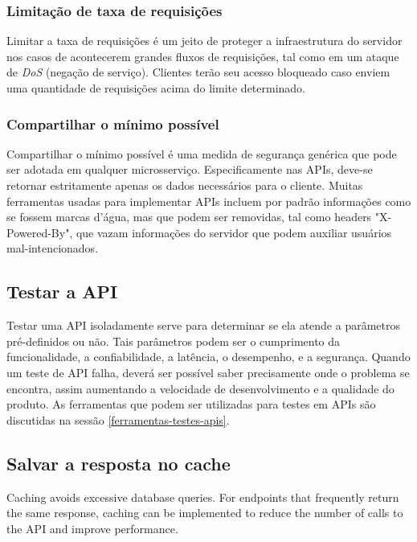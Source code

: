 \subsubsection*{Limitação de taxa de requisições}
Limitar a taxa de requisições é um jeito de proteger a infraestrutura do servidor nos casos de acontecerem grandes fluxos de requisições, tal como em um ataque de \emph{DoS} (negação de serviço). Clientes terão seu acesso bloqueado caso enviem uma quantidade de requisições acima do limite determinado. \cite{rapidAPI-twitter}

\subsubsection*{Compartilhar o mínimo possível}
Compartilhar o mínimo possível é uma medida de segurança genérica que pode ser adotada em qualquer microsserviço. Especificamente nas APIs, deve-se retornar estritamente apenas os dados necessários para o cliente. Muitas ferramentas usadas para implementar APIs incluem por padrão informações como se fossem marcas d'água, mas que podem ser removidas, tal como headers "X-Powered-By", que vazam informações do servidor que podem auxiliar usuários mal-intencionados. \cite{rapidAPI-twitter}

\subsection{Testar a API}
Testar uma API isoladamente serve para determinar se ela atende a parâmetros pré-definidos ou não. Tais parâmetros podem ser o cumprimento da funcionalidade, a confiabilidade, a latência, o desempenho, e a segurança. Quando um teste de API falha, deverá ser possível saber precisamente onde o problema se encontra, assim aumentando a velocidade de desenvolvimento e a qualidade do produto. As ferramentas que podem ser utilizadas para testes em APIs são discutidas na sessão \autoref{ferramentas-testes-apis}.


\subsection{Salvar a resposta no cache}
Caching avoids excessive database queries. For endpoints that frequently return the same response, caching can be implemented to reduce the number of calls to the API and improve performance. \cite{rapidAPI-twitter}

